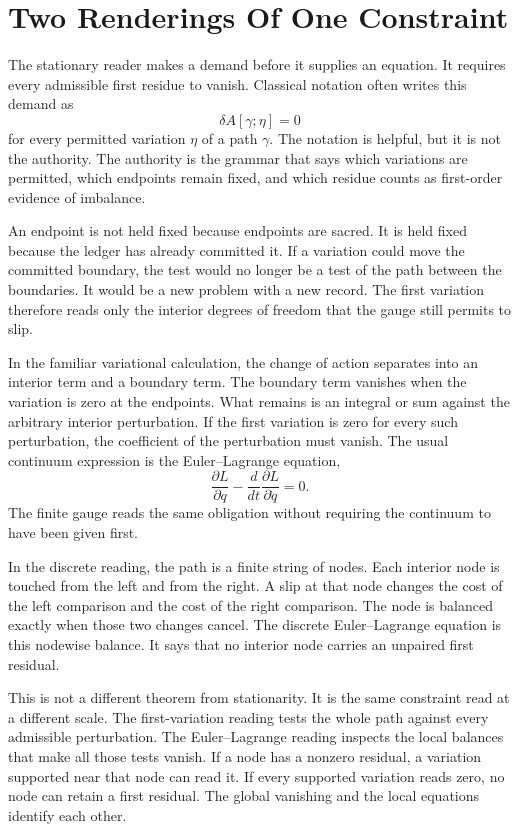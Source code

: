\section{Two Renderings Of One Constraint}

The stationary reader makes a demand before it supplies an equation. It
requires every admissible first residue to vanish. Classical notation often
writes this demand as
\[
  \delta A[\gamma;\eta] = 0
\]
for every permitted variation \(\eta\) of a path \(\gamma\). The notation is
helpful, but it is not the authority. The authority is the grammar that says
which variations are permitted, which endpoints remain fixed, and which
residue counts as first-order evidence of imbalance.

An endpoint is not held fixed because endpoints are sacred. It is held fixed
because the ledger has already committed it. If a variation could move the
committed boundary, the test would no longer be a test of the path between
the boundaries. It would be a new problem with a new record. The first
variation therefore reads only the interior degrees of freedom that the
gauge still permits to slip.

In the familiar variational calculation, the change of action separates
into an interior term and a boundary term. The boundary term vanishes when
the variation is zero at the endpoints. What remains is an integral or sum
against the arbitrary interior perturbation. If the first variation is zero
for every such perturbation, the coefficient of the perturbation must
vanish. The usual continuum expression is the Euler--Lagrange equation,
\[
  \frac{\partial L}{\partial q}
  - \frac{d}{dt}\frac{\partial L}{\partial \dot q} = 0 .
\]
The finite gauge reads the same obligation without requiring the continuum
to have been given first.

In the discrete reading, the path is a finite string of nodes. Each interior
node is touched from the left and from the right. A slip at that node changes
the cost of the left comparison and the cost of the right comparison. The
node is balanced exactly when those two changes cancel. The discrete
Euler--Lagrange equation is this nodewise balance. It says that no interior
node carries an unpaired first residual.

This is not a different theorem from stationarity. It is the same constraint
read at a different scale. The first-variation reading tests the whole path
against every admissible perturbation. The Euler--Lagrange reading inspects
the local balances that make all those tests vanish. If a node has a
nonzero residual, a variation supported near that node can read it. If every
supported variation reads zero, no node can retain a first residual. The
global vanishing and the local equations identify each other.

